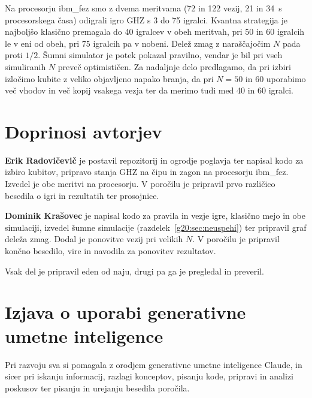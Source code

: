 Na procesorju ibm\_fez smo z dvema meritvama (72 in 122 vezij, 21 in 34~s procesorskega časa) odigrali igro GHZ s 3 do 75 igralci. Kvantna strategija je najboljšo klasično premagala do 40 igralcev v obeh meritvah, pri 50 in 60 igralcih le v eni od obeh, pri 75 igralcih pa v nobeni. Delež zmag z naraščajočim $N$ pada proti $1/2$. Šumni simulator je potek pokazal pravilno, vendar je bil pri vseh simuliranih $N$ preveč optimističen. Za nadaljnje delo predlagamo, da pri izbiri izločimo kubite z veliko objavljeno napako branja, da pri $N=50$ in 60 uporabimo več vhodov in več kopij vsakega vezja ter da merimo tudi med 40 in 60 igralci.


\section*{Doprinosi avtorjev}

\noindent\textbf{Erik Radovičevič} je postavil repozitorij in ogrodje poglavja ter napisal kodo za izbiro kubitov, pripravo stanja GHZ na čipu in zagon na procesorju ibm\_fez. Izvedel je obe meritvi na procesorju. V poročilu je pripravil prvo različico besedila o igri in rezultatih ter prosojnice.

\noindent\textbf{Dominik Krašovec} je napisal kodo za pravila in vezje igre, klasično mejo in obe simulaciji, izvedel šumne simulacije (razdelek~\ref{g20:sec:neuspehi}) ter pripravil graf deleža zmag. Dodal je ponovitve vezij pri velikih $N$. V poročilu je pripravil končno besedilo, vire in navodila za ponovitev rezultatov.

\noindent Vsak del je pripravil eden od naju, drugi pa ga je pregledal in preveril.

\section*{Izjava o uporabi generativne umetne inteligence}

Pri razvoju sva si pomagala z orodjem generativne umetne inteligence Claude, in sicer pri iskanju informacij, razlagi konceptov, pisanju kode, pripravi in analizi poskusov ter pisanju in urejanju besedila poročila.
